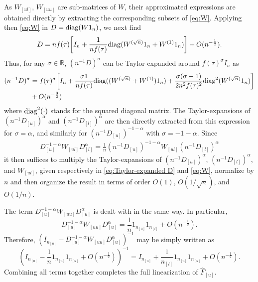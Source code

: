 \documentclass[twoside,11pt]{article}
\def\ftau{f(\tau)}
\begin{document}
	As $W_{[ul]}$, $W_{[uu]}$ are sub-matrices of $W$, their approximated expressions are obtained directly by extracting the corresponding subsets of \eqref{eq:W}. Applying then \eqref{eq:W} in $D={\rm diag}(W1_{n})$, we next find
	\begin{align*}
		D=nf(\tau)\bigg[I_{n}+\frac{1}{n\ftau}{\rm diag}(W^{(\sqrt{n})}1_{n}+W^{(1)}1_{n})\bigg]+O(n^{-\frac{1}{2}}).
	\end{align*}
Thus, for any $\sigma\in\mathbb{R}$, $(n^{-1}D)^{\sigma}$ can be Taylor-expanded around $\ftau^{\sigma}I_{n}$ as
\begin{align}
\label{eq:Taylor-expanded D}
(n^{-1}D)^{\sigma}&=\ftau^{\sigma}\bigg[I_{n}+\frac{\sigma1}{n\ftau}{\rm diag}((W^{(\sqrt{n})}+W^{(1)})1_{n}) + \frac{\sigma(\sigma-1)}{2n^{2}\ftau^{2}}{\rm diag}^{2}(W^{(\sqrt{n})}1_{n})\bigg]\nonumber\\
&+O(n^{-\frac{3}{2}})
\end{align}
where ${\rm diag}^{2}(\cdot)$ stands for the squared diagonal matrix. The Taylor-expansions of $(n^{-1}D_{[u]})^{\alpha}$ and $(n^{-1}D_{[l]})^{\alpha}$ are then directly extracted from this expression for $\sigma=\alpha$, and similarly for $(n^{-1}D_{[u]})^{-1-\alpha}$ with $\sigma=-1-\alpha$. Since 
\begin{align*}
	D_{[u]}^{-1-\alpha}W_{[ul]}D_{[l]}^{\alpha}=\frac{1}{n}(n^{-1}D_{[u]})^{-1-\alpha}W_{[ul]}(n^{-1}D_{[l]})^{\alpha}
\end{align*}
it then suffices to multiply the Taylor-expansions of $(n^{-1}D_{[u]})^{\alpha}$, $(n^{-1}D_{[l]})^{\alpha}$, and $W_{[ul]}$, given respectively in \eqref{eq:Taylor-expanded D} and \eqref{eq:W}, normalize by $n$ and then organize the result in terms of order $O(1)$, $O(1/\sqrt{n})$, and $O(1/n)$. 

The term $D_{[u]}^{-1-\alpha}W_{[uu]}D_{[u]}^{\alpha}$ is dealt with in the same way. In particular,
\begin{equation*}
	D_{[u]}^{-1-\alpha}W_{[uu]}D_{[u]}^{\alpha}=\frac{1}{n}1_{n_{[u]}}1_{n_{[l]}}+O(n^{-\frac{1}{2}}).
\end{equation*}
Therefore, $(I_{n_{[u]}}-D_{[u]}^{-1-\alpha}W_{[uu]}D_{[u]}^{\alpha})^{-1}$ may be simply written as
\begin{equation*}
	\left(I_{n_{[u]}}-\frac{1}{n}1_{n_{[u]}}1_{n_{[u]}} + O(n^{-\frac{1}{2}}) \right)^{-1}=I_{n_{[u]}}+\frac{1}{n_{[l]}}1_{n_{[u]}}1_{n_{[u]}} + O(n^{-\frac{1}{2}}).
\end{equation*}
Combining all terms together completes the full linearization of $\hat{F}_{[u]}$. 
\end{document}
